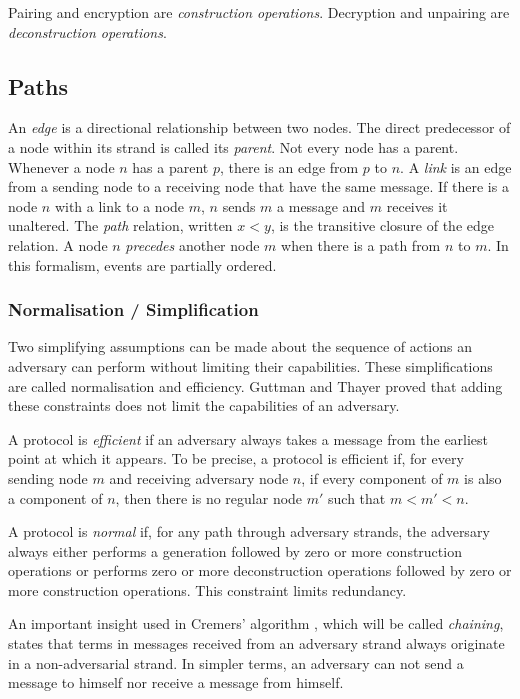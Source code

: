 			Pairing and encryption are \emph{construction operations}.
			Decryption and unpairing are \emph{deconstruction operations}.

		\subsection{Paths}

			An \emph{edge} is a directional relationship between two nodes.
			The direct predecessor of a node within its strand is called its
			\emph{parent}. Not every node has a parent. Whenever a node $n$ has
			a parent $p$, there is an edge from $p$ to $n$. A \emph{link} is an
			edge from a sending node to a receiving node that have the same
			message. If there is a node $n$ with a link to a node $m$, $n$
			sends $m$ a message and $m$ receives it unaltered. The \emph{path}
			relation, written $x < y$, is the transitive closure of the edge
			relation. A node $n$ \emph{precedes} another node $m$ when there is
			a path from $n$ to $m$. In this formalism, events are partially
			ordered.

		\subsubsection{Normalisation / Simplification}

			Two simplifying assumptions can be made about the sequence of
			actions an adversary can perform without limiting their
			capabilities. These simplifications are called normalisation and
			efficiency. Guttman and Thayer \cite{GJF02} proved that adding
			these constraints does not limit the capabilities of an adversary.

			A protocol is \emph{efficient} if an adversary always takes a
			message from the earliest point at which it appears. To be precise,
			a protocol is efficient if, for every sending node $m$ and receiving
			adversary node $n$, if every component of $m$ is also a component of
			$n$, then there is no regular node $m'$ such that $m < m' < n$.

			A protocol is \emph{normal} if, for any path through adversary
			strands, the adversary always either performs a generation followed
			by zero or more construction operations or performs zero or more
			deconstruction operations followed by zero or more construction
			operations. This constraint limits redundancy.

			An important insight used in Cremers' algorithm \cite{Cremers08},
			which will be called \emph{chaining}, states that terms in messages
			received from an adversary strand always originate in a
			non-adversarial strand. In simpler terms, an adversary can not send
			a message to himself nor receive a message from himself.


